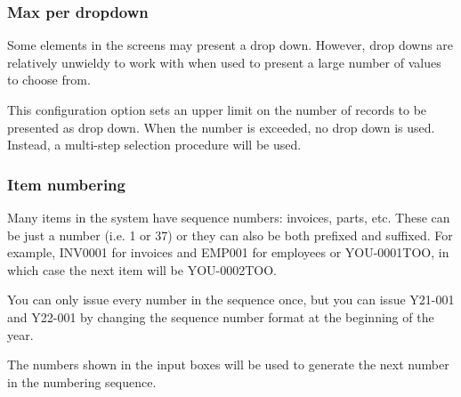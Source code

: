\subsubsection{Max per dropdown}
\label{subsubsec-company-config-defaults-max-dropdown}

Some elements in the screens may present a drop down. However, drop downs are
relatively unwieldy to work with when used to present a large number of values
to choose from.

This configuration option sets an upper limit on the number of records to be
presented as drop down.  When the number is exceeded, no drop down is used.  Instead,
a multi-step selection procedure will be used.

\subsubsection{Item numbering}
\label{subsubsec-company-config-defaults-item-numbers}

Many items in the system have sequence numbers: invoices, parts, etc.
These  can be just a number (i.e. 1 or 37) or
they can also be both prefixed and suffixed. For example, INV0001 for invoices and EMP001 for employees or YOU-0001TOO, in which case the next item will be YOU-0002TOO. 

You can only issue every number in the sequence once, but you can issue Y21-001 and Y22-001 by changing the sequence number format at the beginning of the year.

The numbers shown in the input boxes will be used to generate the next number in the
numbering sequence.

